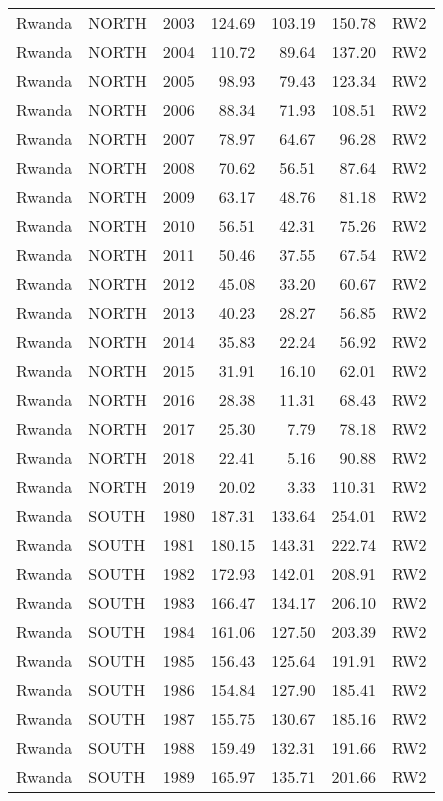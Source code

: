 \begin{longtable}{lllrrrl}
  Rwanda & NORTH & 2003 & 124.69 & 103.19 & 150.78 & RW2 \\ 
  Rwanda & NORTH & 2004 & 110.72 & 89.64 & 137.20 & RW2 \\ 
  Rwanda & NORTH & 2005 & 98.93 & 79.43 & 123.34 & RW2 \\ 
  Rwanda & NORTH & 2006 & 88.34 & 71.93 & 108.51 & RW2 \\ 
  Rwanda & NORTH & 2007 & 78.97 & 64.67 & 96.28 & RW2 \\ 
  Rwanda & NORTH & 2008 & 70.62 & 56.51 & 87.64 & RW2 \\ 
  Rwanda & NORTH & 2009 & 63.17 & 48.76 & 81.18 & RW2 \\ 
  Rwanda & NORTH & 2010 & 56.51 & 42.31 & 75.26 & RW2 \\ 
  Rwanda & NORTH & 2011 & 50.46 & 37.55 & 67.54 & RW2 \\ 
  Rwanda & NORTH & 2012 & 45.08 & 33.20 & 60.67 & RW2 \\ 
  Rwanda & NORTH & 2013 & 40.23 & 28.27 & 56.85 & RW2 \\ 
  Rwanda & NORTH & 2014 & 35.83 & 22.24 & 56.92 & RW2 \\ 
  Rwanda & NORTH & 2015 & 31.91 & 16.10 & 62.01 & RW2 \\ 
  Rwanda & NORTH & 2016 & 28.38 & 11.31 & 68.43 & RW2 \\ 
  Rwanda & NORTH & 2017 & 25.30 & 7.79 & 78.18 & RW2 \\ 
  Rwanda & NORTH & 2018 & 22.41 & 5.16 & 90.88 & RW2 \\ 
  Rwanda & NORTH & 2019 & 20.02 & 3.33 & 110.31 & RW2 \\ 
  Rwanda & SOUTH & 1980 & 187.31 & 133.64 & 254.01 & RW2 \\ 
  Rwanda & SOUTH & 1981 & 180.15 & 143.31 & 222.74 & RW2 \\ 
  Rwanda & SOUTH & 1982 & 172.93 & 142.01 & 208.91 & RW2 \\ 
  Rwanda & SOUTH & 1983 & 166.47 & 134.17 & 206.10 & RW2 \\ 
  Rwanda & SOUTH & 1984 & 161.06 & 127.50 & 203.39 & RW2 \\ 
  Rwanda & SOUTH & 1985 & 156.43 & 125.64 & 191.91 & RW2 \\ 
  Rwanda & SOUTH & 1986 & 154.84 & 127.90 & 185.41 & RW2 \\ 
  Rwanda & SOUTH & 1987 & 155.75 & 130.67 & 185.16 & RW2 \\ 
  Rwanda & SOUTH & 1988 & 159.49 & 132.31 & 191.66 & RW2 \\ 
  Rwanda & SOUTH & 1989 & 165.97 & 135.71 & 201.66 & RW2 \\ 

\end{longtable}
